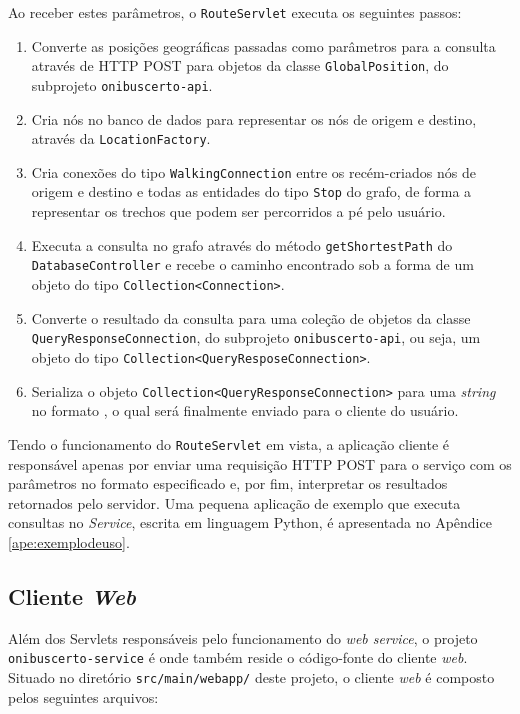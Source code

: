 Ao receber estes parâmetros, o \texttt{RouteServlet} executa os seguintes passos:
\begin{enumerate}
	\item Converte as posições geográficas passadas como parâmetros para a consulta através de HTTP POST para objetos da classe \texttt{GlobalPosition}, do subprojeto \texttt{onibuscerto-api}.
	\item Cria nós no banco de dados para representar os nós de origem e destino, através da \texttt{LocationFactory}.
	\item Cria conexões do tipo \texttt{WalkingConnection} entre os recém-criados nós de origem e destino e todas as entidades do tipo \texttt{Stop} do grafo, de forma a representar os trechos que podem ser percorridos a pé pelo usuário.
	\item Executa a consulta no grafo através do método \texttt{getShortestPath} do \texttt{DatabaseController} e recebe o caminho encontrado sob a forma de um objeto do tipo \texttt{Collection<Connection>}.
	\item Converte o resultado da consulta para uma coleção de objetos da classe \texttt{QueryResponseConnection}, do subprojeto \texttt{onibuscerto-api}, ou seja, um objeto do tipo \texttt{Collection<QueryResposeConnection>}.
	\item Serializa o objeto \texttt{Collection<QueryResponseConnection>} para uma \emph{string} no formato , o qual será finalmente enviado para o cliente do usuário.
\end{enumerate}

Tendo o funcionamento do \texttt{RouteServlet} em vista, a aplicação cliente é responsável apenas por enviar uma requisição HTTP POST para o serviço com os parâmetros no formato especificado e, por fim, interpretar os resultados retornados pelo servidor.
Uma pequena aplicação de exemplo que executa consultas no \emph{Service}, escrita em linguagem Python, é apresentada no Apêndice \ref{ape:exemplodeuso}.

\subsection{Cliente \emph{Web}}

Além dos Servlets responsáveis pelo funcionamento do \emph{web service}, o projeto \texttt{onibuscerto-service} é onde também reside o código-fonte do cliente \emph{web}.
Situado no diretório \texttt{src/main/webapp/} deste projeto, o cliente \emph{web} é composto pelos seguintes arquivos:

